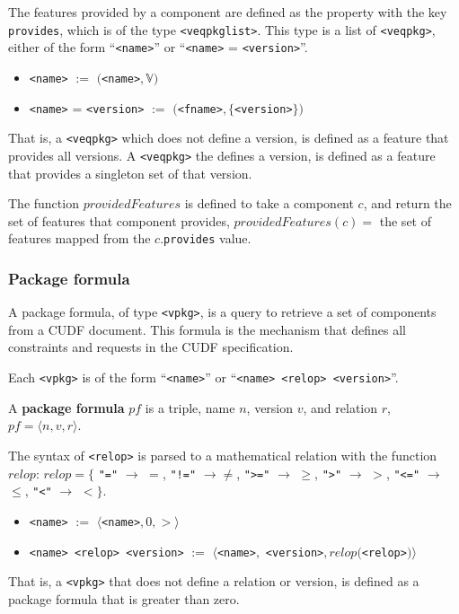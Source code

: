 The features provided by a component are defined as the property with the key \verb+provides+, which is of the type \texttt{<veqpkglist>}.
This type is a list of \texttt{<veqpkg>}, either of the form ``\verb+<name>+'' or  ``\verb+<name>+ = \verb+<version>+''.
\begin{itemize}
  \item \verb+<name>+ $:=$ $($\verb+<name>+$,\mathbb{V})$
  \item \verb+<name>+ = \verb+<version>+ $:=$ $($\verb+<fname>+$,\{$\verb+<version>+$\})$
\end{itemize}
That is, a \texttt{<veqpkg>} which does not define a version, is defined as a feature that provides all versions.
A  \texttt{<veqpkg>} the defines a version, is defined as a feature that provides a singleton set of that version.

\begin{defs}
The function $providedFeatures$ is defined to take a component $c$, and return the set of features that component provides,
$providedFeatures(c) =$ the set of features mapped from the $c$.\texttt{provides} value.
\end{defs}

\subsubsection{Package formula}
A package formula, of type \texttt{<vpkg>}, is a query to retrieve a set of components from a CUDF document.
This formula is the mechanism that defines all constraints and requests in the CUDF specification.

Each \texttt{<vpkg>} is of the form ``\texttt{<name>}'' or  ``\texttt{<name> <relop> <version>}''.
\begin{defs}
A \textbf{package formula} $pf$ is a triple, name $n$, version $v$, and relation $r$, $pf = \langle n, v , r \rangle$.
\end{defs}

The syntax of \verb+<relop>+ is parsed to a mathematical relation with the function $relop$:  
$relop = \{$ \verb+"="+ $\rightarrow$ $=$, \verb+"!="+ $\rightarrow \not =$, 
\verb+">="+ $\rightarrow$ $\geq$, \verb+">"+ $\rightarrow$ $>$, \verb+"<="+ $\rightarrow$ $\leq$, \verb+"<"+ $\rightarrow$ $<$$\}$.

\begin{itemize}
  \item \texttt{<name>} $:=$ $\langle $\texttt{<name>}$, 0 , > \rangle$
  \item \texttt{<name> <relop> <version>} $:=$ $\langle $\texttt{<name>}$,$ \texttt{<version>}$, relop($\texttt{<relop>}$) \rangle$
\end{itemize}
That is, a \texttt{<vpkg>} that does not define a relation or version, is defined as a package formula that is greater than zero.

